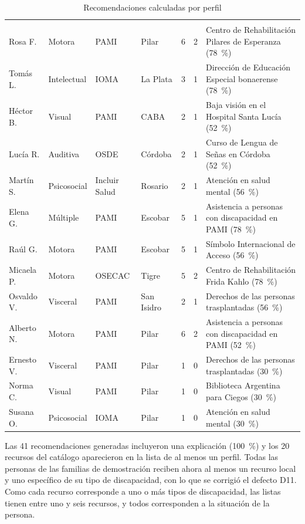 {\footnotesize
\begin{xltabular}{\textwidth}{l l l l l l >{\raggedright\arraybackslash}X}
\caption{Recomendaciones calculadas por perfil}\label{tab:c7-12}\\
\toprule
{} &  &  &  &  &  &  \\
\midrule
\endfirsthead
\toprule
{} &  &  &  &  &  &  \\
\midrule
\endhead
\bottomrule
\endfoot
Rosa F. & Motora & PAMI & Pilar & 6 & 2 & Centro de Rehabilitación Pilares de Esperanza (78~\%) \\
Tomás L. & Intelectual & IOMA & La Plata & 3 & 1 & Dirección de Educación Especial bonaerense (78~\%) \\
Héctor B. & Visual & PAMI & CABA & 2 & 1 & Baja visión en el Hospital Santa Lucía (52~\%) \\
Lucía R. & Auditiva & OSDE & Córdoba & 2 & 1 & Curso de Lengua de Señas en Córdoba (52~\%) \\
Martín S. & Psicosocial & Incluir Salud & Rosario & 2 & 1 & Atención en salud mental (56~\%) \\
Elena G. & Múltiple & PAMI & Escobar & 5 & 1 & Asistencia a personas con discapacidad en PAMI (78~\%) \\
Raúl G. & Motora & PAMI & Escobar & 5 & 1 & Símbolo Internacional de Acceso (56~\%) \\
Micaela P. & Motora & OSECAC & Tigre & 5 & 2 & Centro de Rehabilitación Frida Kahlo (78~\%) \\
Osvaldo V. & Visceral & PAMI & San Isidro & 2 & 1 & Derechos de las personas trasplantadas (56~\%) \\
Alberto N. & Motora & PAMI & Pilar & 6 & 2 & Asistencia a personas con discapacidad en PAMI (52~\%) \\
Ernesto V. & Visceral & PAMI & Pilar & 1 & 0 & Derechos de las personas trasplantadas (30~\%) \\
Norma C. & Visual & PAMI & Pilar & 1 & 0 & Biblioteca Argentina para Ciegos (30~\%) \\
Susana O. & Psicosocial & IOMA & Pilar & 1 & 0 & Atención en salud mental (30~\%) \\
\end{xltabular}
}

Las 41 recomendaciones generadas incluyeron una explicación (100~\%) y los 20 recursos del catálogo aparecieron en la lista de al menos un perfil. Todas las personas de las familias de demostración reciben ahora al menos un recurso local y uno específico de su tipo de discapacidad, con lo que se corrigió el defecto D11. Como cada recurso corresponde a uno o más tipos de discapacidad, las listas tienen entre uno y seis recursos, y todos corresponden a la situación de la persona.

